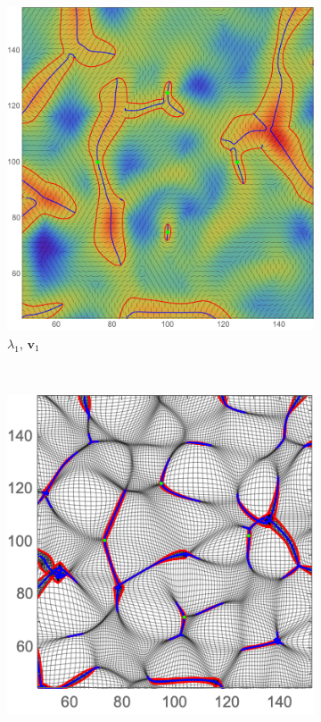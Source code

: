 \documentclass[a4paper, 11pt]{article}
\begin{document}
\begin{figure}
\centering
\begin{subfigure}[b]{0.49\textwidth}
\includegraphics[width=\textwidth]{Composite_L}
\caption{$\lambda_1$, $\bm{v}_1$}
\end{subfigure}~
\begin{subfigure}[b]{0.49\textwidth}
\includegraphics[width=\textwidth]{Composite_Z}

\end{subfigure}
\end{figure}
\end{document}
